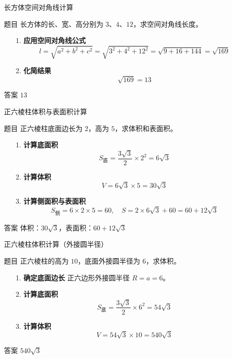   \begin{frame}{长方体空间对角线计算}
    \begin{block}{题目}
      长方体的长、宽、高分别为 \(3\)、\(4\)、\(12\)，求空间对角线长度。
    \end{block}
  \pause
    \begin{enumerate}
      \item[1.] \textbf{应用空间对角线公式}  
        \[
        l = \sqrt{a^2 + b^2 + c^2} = \sqrt{3^2 + 4^2 + 12^2} = \sqrt{9 + 16 + 144} = \sqrt{169}
        \]
      \item[2.] \textbf{化简结果}  
        \[
        \sqrt{169} = 13
        \]
    \end{enumerate}
  
    \begin{exampleblock}{答案}
      \(\boxed{13}\)
    \end{exampleblock}
  \end{frame}
  
  \begin{frame}{正六棱柱体积与表面积计算}
    \begin{block}{题目}
      正六棱柱底面边长为 \(2\)，高为 \(5\)，求体积和表面积。
    \end{block}
  \pause
    \begin{enumerate}
      \item[1.] \textbf{计算底面积}  
        \[
        S_{\text{底}} = \frac{3\sqrt{3}}{2} \times 2^2 = 6\sqrt{3}
        \]
      \item[2.] \textbf{计算体积}  
        \[
        V = 6\sqrt{3} \times 5 = 30\sqrt{3}
        \]
      \item[3.] \textbf{计算侧面积与表面积}  
        \[
        S_{\text{侧}} = 6 \times 2 \times 5 = 60, \quad S = 2 \times 6\sqrt{3} + 60 = 60 + 12\sqrt{3}
        \]
    \end{enumerate}
  
    \begin{exampleblock}{答案}
      体积：\(\boxed{30\sqrt{3}}\)，表面积：\(\boxed{60 + 12\sqrt{3}}\)
    \end{exampleblock}
  \end{frame}
  

  \begin{frame}{正六棱柱体积计算（外接圆半径）}
    \begin{block}{题目}
      正六棱柱的高为 \(10\)，底面外接圆半径为 \(6\)，求体积。
    \end{block}
  \pause
    \begin{enumerate}
      \item[1.] \textbf{确定底面边长}  
        正六边形外接圆半径 \(R = a = 6\)。
      \item[2.] \textbf{计算底面积}  
        \[
        S_{\text{底}} = \frac{3\sqrt{3}}{2} \times 6^2 = 54\sqrt{3}
        \]
      \item[3.] \textbf{计算体积}  
        \[
        V = 54\sqrt{3} \times 10 = 540\sqrt{3}
        \]
    \end{enumerate}
  
    \begin{exampleblock}{答案}
      \(\boxed{540\sqrt{3}}\)
    \end{exampleblock}
  \end{frame}
  